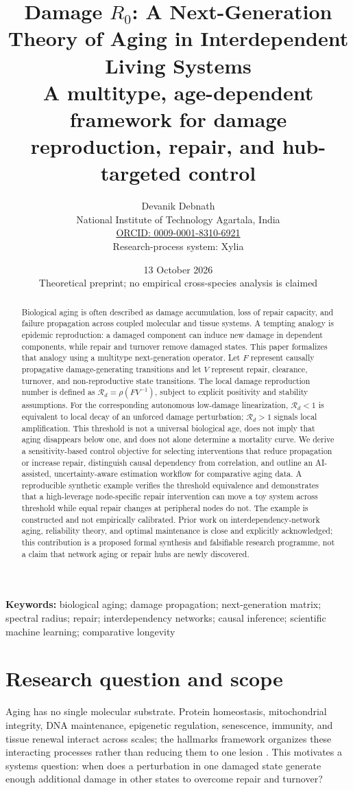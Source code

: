 \documentclass[11pt,a4paper]{article}
\title{\textbf{Damage $R_0$: A Next-Generation Theory of Aging in Interdependent Living Systems}\\[0.35em]\large A multitype, age-dependent framework for damage reproduction, repair, and hub-targeted control}
\author{Devanik Debnath\\\small National Institute of Technology Agartala, India\\\small \href{https://orcid.org/0009-0001-8310-6921}{ORCID: 0009-0001-8310-6921}\\[0.4em]\small Research-process system: Xylia}
\date{13 October 2026\\[0.25em]\small Theoretical preprint; no empirical cross-species analysis is claimed}
\newcommand{\Rd}{\mathcal{R}_{d}}
\begin{document}
\maketitle
\begin{abstract}
Biological aging is often described as damage accumulation, loss of repair capacity, and failure propagation across coupled molecular and tissue systems. A tempting analogy is epidemic reproduction: a damaged component can induce new damage in dependent components, while repair and turnover remove damaged states. This paper formalizes that analogy using a multitype next-generation operator. Let $F$ represent causally propagative damage-generating transitions and let $V$ represent repair, clearance, turnover, and non-reproductive state transitions. The local damage reproduction number is defined as $\Rd=\rho(FV^{-1})$, subject to explicit positivity and stability assumptions. For the corresponding autonomous low-damage linearization, $\Rd<1$ is equivalent to local decay of an unforced damage perturbation; $\Rd>1$ signals local amplification. This threshold is not a universal biological age, does not imply that aging disappears below one, and does not alone determine a mortality curve. We derive a sensitivity-based control objective for selecting interventions that reduce propagation or increase repair, distinguish causal dependency from correlation, and outline an AI-assisted, uncertainty-aware estimation workflow for comparative aging data. A reproducible synthetic example verifies the threshold equivalence and demonstrates that a high-leverage node-specific repair intervention can move a toy system across threshold while equal repair changes at peripheral nodes do not. The example is constructed and not empirically calibrated. Prior work on interdependency-network aging, reliability theory, and optimal maintenance is close and explicitly acknowledged; this contribution is a proposed formal synthesis and falsifiable research programme, not a claim that network aging or repair hubs are newly discovered.
\end{abstract}

\textbf{Keywords:} biological aging; damage propagation; next-generation matrix; spectral radius; repair; interdependency networks; causal inference; scientific machine learning; comparative longevity

\section{Research question and scope}
Aging has no single molecular substrate. Protein homeostasis, mitochondrial integrity, DNA maintenance, epigenetic regulation, senescence, immunity, and tissue renewal interact across scales; the hallmarks framework organizes these interacting processes rather than reducing them to one lesion \citep{lopezotin2023}. This motivates a systems question: when does a perturbation in one damaged state generate enough additional damage in other states to overcome repair and turnover?
\end{document}
